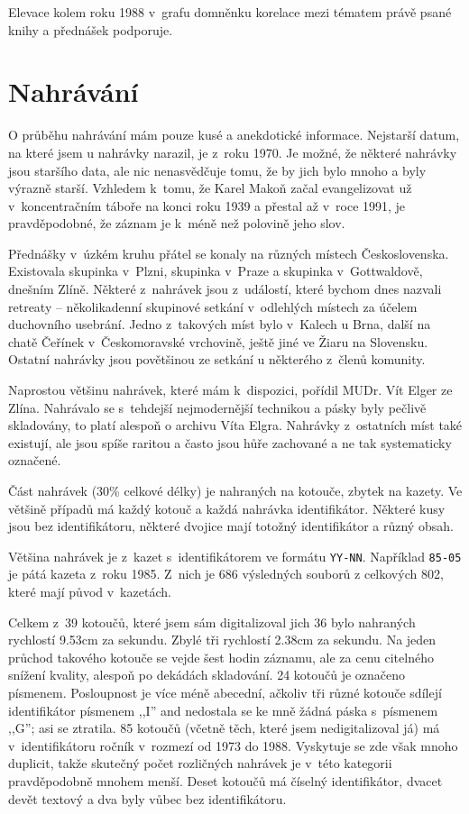 Elevace kolem roku 1988 v~grafu domněnku korelace mezi tématem právě psané knihy
a přednášek podporuje.

\section{Nahrávání}

O průběhu nahrávání mám pouze kusé a anekdotické informace. Nejstarší datum, na
které jsem u nahrávky narazil, je z~roku 1970. Je možné, že některé nahrávky
jsou staršího data, ale nic nenasvědčuje tomu, že by jich bylo mnoho a byly
výrazně starší. Vzhledem k~tomu, že Karel Makoň začal evangelizovat už
v~koncentračním táboře na konci roku 1939 a přestal až v~roce 1991, je
pravděpodobné, že záznam je k~méně než polovině jeho slov.

Přednášky v~úzkém kruhu přátel se konaly na různých místech Československa.
Existovala skupinka v~Plzni, skupinka v~Praze a skupinka v~Gottwaldově, dnešním
Zlíně. Některé z~nahrávek jsou z~událostí, které bychom dnes nazvali retreaty --
několikadenní skupinové setkání v~odlehlých místech za účelem duchovního
usebrání. Jedno z~takových míst bylo v~Kalech u Brna, další na chatě Čeřínek
v~Českomoravské vrchovině, ještě jiné ve Žiaru na Slovensku. Ostatní nahrávky
jsou povětšinou ze setkání u některého z~členů komunity.

Naprostou většinu nahrávek, které mám k~dispozici, pořídil MUDr. Vít Elger ze
Zlína. Nahrávalo se s~tehdejší nejmodernější technikou a pásky byly pečlivě
skladovány, to platí alespoň o archivu Víta Elgra. Nahrávky z~ostatních míst
také existují, ale jsou spíše raritou a často jsou hůře zachované a ne tak
systematicky označené.

Část nahrávek (30\% celkové délky) je nahraných na kotouče, zbytek na kazety. Ve
většině případů má každý kotouč a každá nahrávka identifikátor. Některé kusy
jsou bez identifikátoru, některé dvojice mají totožný identifikátor a různý
obsah.

Většina nahrávek je z~kazet s~identifikátorem ve formátu \texttt{YY-NN}.
Například \texttt{85-05} je pátá kazeta z~roku 1985. Z~nich je 686
výsledných souborů z celkových 802, které mají původ v~kazetách.

Celkem z~39 kotoučů, které jsem sám digitalizoval jich 36 bylo nahraných
rychlostí 9.53cm za sekundu. Zbylé tři rychlostí 2.38cm za sekundu. Na jeden
průchod takového kotouče se vejde šest hodin záznamu, ale za cenu citelného
snížení kvality, alespoň po dekádách skladování. 24 kotoučů je označeno
písmenem. Posloupnost je více méně abecední, ačkoliv tři různé kotouče sdílejí
identifikátor písmenem ,,I'' and nedostala se ke mně žádná páska s~písmenem
,,G''; asi se ztratila. 85 kotoučů (včetně těch, které jsem nedigitalizoval já)
má v~identifikátoru ročník v~rozmezí od 1973 do 1988. Vyskytuje se zde však
mnoho duplicit, takže skutečný počet rozličných nahrávek je v~této kategorii
pravděpodobně mnohem menší. Deset kotoučů má číselný identifikátor, dvacet devět
textový a dva byly vůbec bez identifikátoru.

